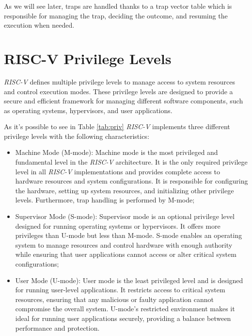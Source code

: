 As we will see later, traps are handled thanks to a trap vector table which is
responsible for managing the trap, deciding the outcome, and resuming the
execution when needed.

\section{RISC-V Privilege Levels}
\label{sec:riscv_privileges}

\textit{RISC-V} defines multiple privilege levels to manage access to system
resources and control execution modes. These privilege levels are designed to provide
a secure and efficient framework for managing different software components,
such as operating systems, hypervisors, and user applications.

As it's possible to see in Table \ref{tab:priv} \textit{RISC-V} implements three
different privilege levels with the following characteristics:

\begin{itemize}
  \item Machine Mode (M-mode): Machine mode is the most privileged and
    fundamental level in the \textit{RISC-V} architecture. It is the only
    required privilege level in all \textit{RISC-V} implementations and provides
    complete access to hardware resources and system configurations. It is
    responsible for configuring the hardware, setting up system resources, and
    initializing other privilege levels. Furthermore, trap handling is performed
    by M-mode;

  \item Supervisor Mode (S-mode): Supervisor mode is an optional privilege level
    designed for running operating systems or hypervisors. It offers more privileges
    than U-mode but less than M-mode. S-mode enables an operating system to
    manage resources and control hardware with enough authority while ensuring
    that user applications cannot access or alter critical system configurations;

  \item User Mode (U-mode): User mode is the least privileged level and is
    designed for running user-level applications. It restricts access to critical
    system resources, ensuring that any malicious or faulty application cannot
    compromise the overall system. U-mode's restricted environment makes it ideal
    for running user applications securely, providing a balance between
    performance and protection.
\end{itemize}

